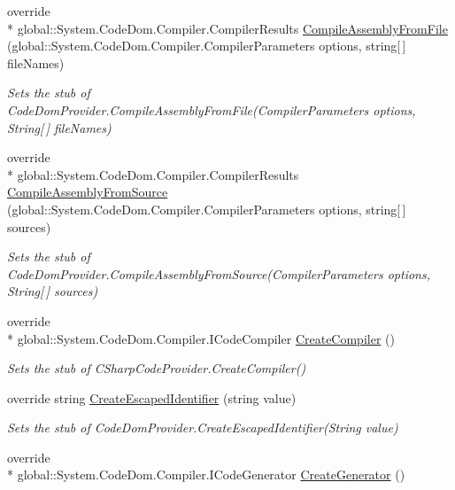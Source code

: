 \begin{DoxyCompactItemize}
override \\*
global\-::\-System.\-Code\-Dom.\-Compiler.\-Compiler\-Results \hyperlink{class_microsoft_1_1_c_sharp_1_1_fakes_1_1_stub_c_sharp_code_provider_a7d74a687cb45b131d4c2b1c37d69f7a6}{Compile\-Assembly\-From\-File} (global\-::\-System.\-Code\-Dom.\-Compiler.\-Compiler\-Parameters options, string\mbox{[}$\,$\mbox{]} file\-Names)
\begin{DoxyCompactList}\small\item\em Sets the stub of Code\-Dom\-Provider.\-Compile\-Assembly\-From\-File(\-Compiler\-Parameters options, String\mbox{[}$\,$\mbox{]} file\-Names)\end{DoxyCompactList}\item 
override \\*
global\-::\-System.\-Code\-Dom.\-Compiler.\-Compiler\-Results \hyperlink{class_microsoft_1_1_c_sharp_1_1_fakes_1_1_stub_c_sharp_code_provider_afeeeec360d340567e0cfead7f1d029bd}{Compile\-Assembly\-From\-Source} (global\-::\-System.\-Code\-Dom.\-Compiler.\-Compiler\-Parameters options, string\mbox{[}$\,$\mbox{]} sources)
\begin{DoxyCompactList}\small\item\em Sets the stub of Code\-Dom\-Provider.\-Compile\-Assembly\-From\-Source(\-Compiler\-Parameters options, String\mbox{[}$\,$\mbox{]} sources)\end{DoxyCompactList}\item 
override \\*
global\-::\-System.\-Code\-Dom.\-Compiler.\-I\-Code\-Compiler \hyperlink{class_microsoft_1_1_c_sharp_1_1_fakes_1_1_stub_c_sharp_code_provider_a0a5c18355637845d8e7adb56e447d2bd}{Create\-Compiler} ()
\begin{DoxyCompactList}\small\item\em Sets the stub of C\-Sharp\-Code\-Provider.\-Create\-Compiler()\end{DoxyCompactList}\item 
override string \hyperlink{class_microsoft_1_1_c_sharp_1_1_fakes_1_1_stub_c_sharp_code_provider_a66fc6f98530a3e88059fdf20451900e1}{Create\-Escaped\-Identifier} (string value)
\begin{DoxyCompactList}\small\item\em Sets the stub of Code\-Dom\-Provider.\-Create\-Escaped\-Identifier(\-String value)\end{DoxyCompactList}\item 
override \\*
global\-::\-System.\-Code\-Dom.\-Compiler.\-I\-Code\-Generator \hyperlink{class_microsoft_1_1_c_sharp_1_1_fakes_1_1_stub_c_sharp_code_provider_a492c01c9d8896a2c60e792b310540ac7}{Create\-Generator} ()

\end{DoxyCompactItemize}
